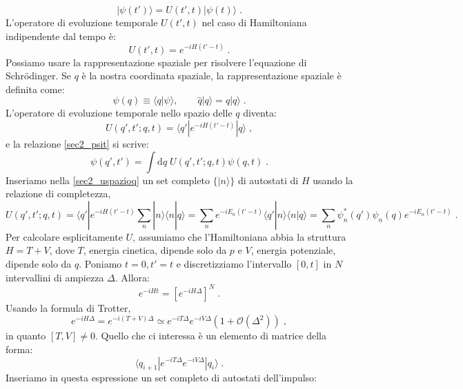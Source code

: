\documentclass[12pt,a4paper]{article}
\theoremstyle{definition}
\numberwithin{equation}{section}
\newcommand{\diff}[1][]{\mathrm{d}#1}
\newcommand{\bra}{\langle}
\newcommand{\ket}{\rangle}
\newcommand{\Sch}{Schrödinger}
\begin{document}
\begin{equation}
|\psi(t')\ket=U(t',t)|\psi(t)\ket\;. \label{sec2_psit}
\end{equation}
L'operatore di evoluzione temporale $U(t',t)$ nel caso di Hamiltoniana indipendente dal tempo è:
\begin{equation}
U(t',t)=e^{-iH(t'-t)}\;.
\end{equation}
Possiamo usare la rappresentazione spaziale per risolvere l'equazione di \, \Sch . Se $q$ è la nostra coordinata spaziale, la rappresentazione spaziale è definita come:
\begin{equation}
\psi(q)\equiv \bra q|\psi\ket,\qquad \hat{q}|q\ket=q|q\ket\;.
\end{equation}
L'operatore di evoluzione temporale nello spazio delle $q$ diventa:
\begin{equation}
U(q',t';q,t)=\bra q'|e^{-iH(t'-t)}|q\ket\;, \label{sec2_uspazioq}
\end{equation}
e la relazione \eqref{sec2_psit} si scrive:
\begin{equation}
\psi(q',t')=\int\diff{q}\;U(q',t';q,t)\psi(q,t)\;.
\end{equation}
Inseriamo nella \eqref{sec2_uspazioq} un set completo $\{|n\ket\}$ di autostati di $H$ usando la relazione di completezza,
\begin{equation}
U(q',t';q,t)= \bra q'|e^{-iH(t'-t)}\sum_n|n\ket\bra n|q\ket=\sum_n e^{-iE_n(t'-t)}\bra q'|n\ket\bra n|q\ket=\sum_n\psi_n^*(q')\psi_n(q)e^{-iE_n(t'-t)}\;.
\end{equation}
Per calcolare esplicitamente $U$, assumiamo che l'Hamiltoniana abbia la struttura $H=T+V$, dove $T$, energia cinetica, dipende solo da $p$ e $V$, energia potenziale, dipende solo da $q$. Poniamo $t=0, t'=t$ e discretizziamo l'intervallo $[0,t]$ in $N$ intervallini di ampiezza $\Delta$. Allora:
\begin{equation}
e^{-iHt}=\left[e^{-iH\Delta}\right]^N\;.
\end{equation}
Usando la formula di Trotter,
\begin{equation}
e^{-iH\Delta}=e^{-i(T+V)\Delta}\simeq e^{-iT\Delta}e^{-iV\Delta}\left(1+\mathcal{O}(\Delta^2)\right)\;,
\end{equation}
in quanto $[T,V]\ne 0$. Quello che ci interessa è un elemento di matrice della forma:
\begin{equation}
\bra q_{i+1}|e^{-iT\Delta}e^{-iV\Delta}|q_i\ket\;.
\end{equation}
Inseriamo in questa espressione un set completo di autostati dell'impulso:
\end{document}
